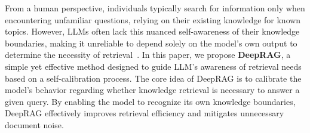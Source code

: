 
From a human perspective, individuals typically search for information only when encountering unfamiliar questions, relying on their existing knowledge for known topics. 
However, LLMs often lack this nuanced self-awareness of their knowledge boundaries, making it unreliable to depend solely on the model's own output to determine the necessity of retrieval~\cite{yin2023large}.
% 
In this paper, we propose \textbf{DeepRAG}, a simple yet effective method designed to guide LLM's awareness of retrieval needs based on a self-calibration process. 
% 
The core idea of DeepRAG is to calibrate the model's behavior regarding whether knowledge retrieval is necessary to answer a given query.
% 
By enabling the model to recognize its own knowledge boundaries, DeepRAG effectively improves retrieval efficiency and mitigates unnecessary document noise. 





